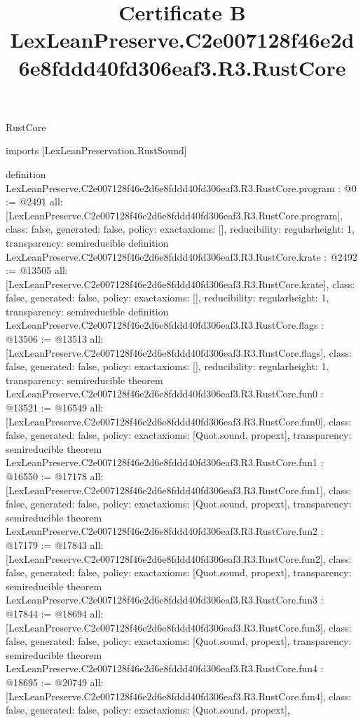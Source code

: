 \begin{lexlean}{RustCore}
\title{Certificate B LexLeanPreserve.C2e007128f46e2d6e8fddd40fd306eaf3.R3.RustCore}
\begin{coremodule}
imports [LexLeanPreservation.RustSound]

definition LexLeanPreserve.C2e007128f46e2d6e8fddd40fd306eaf3.R3.RustCore.program : @0 := @2491 {
  all: [LexLeanPreserve.C2e007128f46e2d6e8fddd40fd306eaf3.R3.RustCore.program],
  class: false,
  generated: false,
  policy: exact{axioms: []},
  reducibility: regular{height: 1},
  transparency: semireducible
}
definition LexLeanPreserve.C2e007128f46e2d6e8fddd40fd306eaf3.R3.RustCore.krate : @2492 := @13505 {
  all: [LexLeanPreserve.C2e007128f46e2d6e8fddd40fd306eaf3.R3.RustCore.krate],
  class: false,
  generated: false,
  policy: exact{axioms: []},
  reducibility: regular{height: 1},
  transparency: semireducible
}
definition LexLeanPreserve.C2e007128f46e2d6e8fddd40fd306eaf3.R3.RustCore.flags : @13506 := @13513 {
  all: [LexLeanPreserve.C2e007128f46e2d6e8fddd40fd306eaf3.R3.RustCore.flags],
  class: false,
  generated: false,
  policy: exact{axioms: []},
  reducibility: regular{height: 1},
  transparency: semireducible
}
theorem LexLeanPreserve.C2e007128f46e2d6e8fddd40fd306eaf3.R3.RustCore.fun0 : @13521 := @16549 {
  all: [LexLeanPreserve.C2e007128f46e2d6e8fddd40fd306eaf3.R3.RustCore.fun0],
  class: false,
  generated: false,
  policy: exact{axioms: [Quot.sound, propext]},
  transparency: semireducible
}
theorem LexLeanPreserve.C2e007128f46e2d6e8fddd40fd306eaf3.R3.RustCore.fun1 : @16550 := @17178 {
  all: [LexLeanPreserve.C2e007128f46e2d6e8fddd40fd306eaf3.R3.RustCore.fun1],
  class: false,
  generated: false,
  policy: exact{axioms: [Quot.sound, propext]},
  transparency: semireducible
}
theorem LexLeanPreserve.C2e007128f46e2d6e8fddd40fd306eaf3.R3.RustCore.fun2 : @17179 := @17843 {
  all: [LexLeanPreserve.C2e007128f46e2d6e8fddd40fd306eaf3.R3.RustCore.fun2],
  class: false,
  generated: false,
  policy: exact{axioms: [Quot.sound, propext]},
  transparency: semireducible
}
theorem LexLeanPreserve.C2e007128f46e2d6e8fddd40fd306eaf3.R3.RustCore.fun3 : @17844 := @18694 {
  all: [LexLeanPreserve.C2e007128f46e2d6e8fddd40fd306eaf3.R3.RustCore.fun3],
  class: false,
  generated: false,
  policy: exact{axioms: [Quot.sound, propext]},
  transparency: semireducible
}
theorem LexLeanPreserve.C2e007128f46e2d6e8fddd40fd306eaf3.R3.RustCore.fun4 : @18695 := @20749 {
  all: [LexLeanPreserve.C2e007128f46e2d6e8fddd40fd306eaf3.R3.RustCore.fun4],
  class: false,
  generated: false,
  policy: exact{axioms: [Quot.sound, propext]},
}
\end{coremodule}
\end{lexlean}
